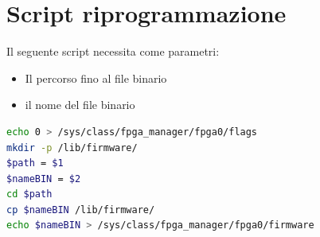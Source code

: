 \section{Script riprogrammazione}
\label{Riprogrammazione}
Il seguente script necessita come parametri:
\begin{itemize}
    \item Il percorso fino al file binario
    \item il nome del file binario
\end{itemize}
\begin{lstlisting}[language=sh, label=lst:sh, caption={Codice completo riprogrammazione automatica FPGA}]
echo 0 > /sys/class/fpga_manager/fpga0/flags
mkdir -p /lib/firmware/
$path = $1
$nameBIN = $2
cd $path
cp $nameBIN /lib/firmware/
echo $nameBIN > /sys/class/fpga_manager/fpga0/firmware
\end{lstlisting}



